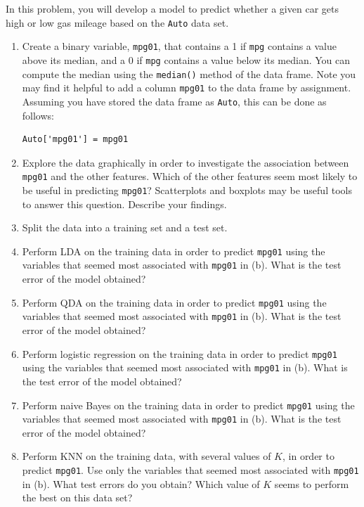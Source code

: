 \documentclass[11pt,a4paper]{article}
\numberwithin{equation}{questao}   %
\begin{document}
In this problem, you will develop a model to predict whether a given car gets high or low gas
mileage based on the \texttt{Auto} data set.
\begin{enumerate}[label=(\alph*)]
\item Create a binary variable, \texttt{mpg01}, that contains a 1 if \texttt{mpg} contains a value
above its median, and a 0 if \texttt{mpg} contains a value below its median. You can compute the
median using the \texttt{median()} method of the data frame. Note you may find it helpful to add a
column \texttt{mpg01} to the data frame by assignment. Assuming you have stored the data frame as
\texttt{Auto}, this can be done as follows:
\begin{lstlisting}[frame=none]
Auto['mpg01'] = mpg01
\end{lstlisting}
\item Explore the data graphically in order to investigate the association between \texttt{mpg01}
and the other features. Which of the other features seem most likely to be useful in predicting
\texttt{mpg01}? Scatterplots and boxplots may be useful tools to answer this question. Describe your findings.
\item Split the data into a training set and a test set.
\item Perform LDA on the training data in order to predict \texttt{mpg01} using the variables that
seemed most associated with \texttt{mpg01} in (b). What is the test error of the model obtained?
\item Perform QDA on the training data in order to predict \texttt{mpg01} using the variables that
seemed most associated with \texttt{mpg01} in (b). What is the test error of the model obtained?
\item Perform logistic regression on the training data in order to predict \texttt{mpg01} using the
variables that seemed most associated with \texttt{mpg01} in (b). What is the test error of the model obtained?
\item Perform naive Bayes on the training data in order to predict \texttt{mpg01} using the
variables that seemed most associated with \texttt{mpg01} in (b). What is the test error of the model obtained?
\item Perform KNN on the training data, with several values of $K$, in order to predict
\texttt{mpg01}. Use only the variables that seemed most associated with \texttt{mpg01} in (b). What
test errors do you obtain? Which value of $K$ seems to perform the best on this data set?
\end{enumerate}
\end{document}
